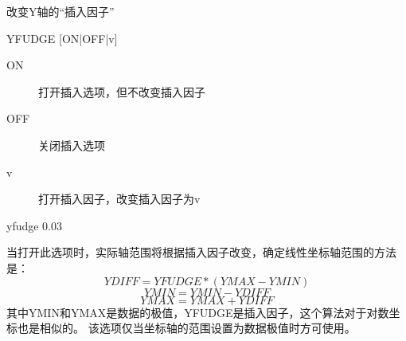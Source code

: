 \label{cmd:yfudge}

改变Y轴的``插入因子''

\begin{SACSTX}
YFUDGE [ON|OFF|v]
\end{SACSTX}

\begin{description}
\item [ON] 打开插入选项，但不改变插入因子 
\item [OFF] 关闭插入选项 
\item [v] 打开插入因子，改变插入因子为v 
\end{description}

\begin{SACDFT}
yfudge 0.03
\end{SACDFT}

当打开此选项时，实际轴范围将根据插入因子改变，确定线性坐标轴范围的方法是：
\[ YDIFF=YFUDGE*(YMAX-YMIN) \]
\[ YMIN=YMIN-YDIFF \]
\[ YMAX=YMAX+YDIFF \]
其中YMIN和YMAX是数据的极值，YFUDGE是插入因子，这个算法对于对数坐标也是相似的。
该选项仅当坐标轴的范围设置为数据极值时方可使用。

